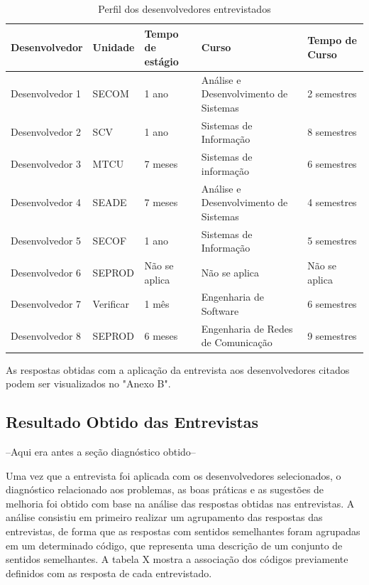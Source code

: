 \begin{table}[h]
	\centering
	\begin{tabular}{|m{2.88cm} | m{2.8cm} | m{2.2cm}| m{2.8cm} | m{2.2cm}|}
		\hline
		\textbf{Desenvolvedor} & \textbf{Unidade} & \textbf{Tempo de estágio} & 
		\textbf{Curso} & \textbf{Tempo de Curso} \\ \hline
		Desenvolvedor 1 & SECOM & 1 ano & Análise e Desenvolvimento de Sistemas & 2 semestres \\
		\hline
		Desenvolvedor 2 & SCV & 1 ano & Sistemas de Informação & 8 semestres \\
		\hline
		Desenvolvedor 3 & MTCU & 7 meses & Sistemas de informação & 6 semestres \\
		\hline
		Desenvolvedor 4 & SEADE & 7 meses & Análise e Desenvolvimento de Sistemas & 4 semestres \\
		\hline
		Desenvolvedor 5 & SECOF & 1 ano & Sistemas de Informação & 5 semestres \\
		\hline
		Desenvolvedor 6 & SEPROD & Não se aplica & Não se aplica & Não se aplica \\
		\hline
		Desenvolvedor 7 & Verificar & 1 mês & Engenharia de Software & 6 semestres \\
		\hline
		Desenvolvedor 8 & SEPROD & 6 meses & Engenharia de Redes de Comunicação & 9 semestres \\
		\hline
	\end{tabular}

	\caption{Perfil dos desenvolvedores entrevistados}
	\label{tab02}
\end{table}

As respostas obtidas com a aplicação da entrevista aos desenvolvedores citados podem ser visualizados no "Anexo B".


\subsection{Resultado Obtido das Entrevistas}
--Aqui era antes a seção diagnóstico obtido--

Uma vez que a entrevista foi aplicada com os desenvolvedores selecionados, o diagnóstico relacionado aos problemas, as boas práticas e as sugestões de melhoria foi obtido com base na análise das respostas obtidas nas entrevistas. A análise consistiu em primeiro realizar um agrupamento das respostas das entrevistas, de forma que as respostas com sentidos semelhantes foram agrupadas em um determinado código, que representa uma descrição de um conjunto de sentidos semelhantes. A tabela X mostra a associação dos códigos previamente definidos com as resposta de cada entrevistado.\pagebreak

